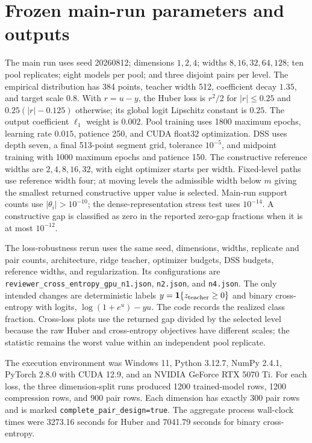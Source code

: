 \documentclass[11pt,a4paper]{article}
\begin{document}
\section*{Frozen main-run parameters and outputs}

The main run uses seed 20260812; dimensions $1,2,4$; widths $8,16,32,64,128$; ten pool replicates; eight models per pool; and three disjoint pairs per level. The empirical distribution has 384 points, teacher width 512, coefficient decay $1.35$, and target scale $0.8$. With $r=u-y$, the Huber loss is $r^2/2$ for $\lvert r\rvert\le0.25$ and $0.25(\lvert r\rvert-0.125)$ otherwise; its global logit Lipschitz constant is $0.25$. The output coefficient $\ell_1$ weight is $0.002$. Pool training uses 1800 maximum epochs, learning rate $0.015$, patience 250, and CUDA float32 optimization. DSS uses depth seven, a final 513-point segment grid, tolerance $10^{-5}$, and midpoint training with 1000 maximum epochs and patience 150. The constructive reference widths are $2,4,8,16,32$, with eight optimizer starts per width. Fixed-level paths use reference width four; at moving levels the admissible width below $m$ giving the smallest returned constructive upper value is selected. Main-run support counts use $\lvert\theta_i\rvert>10^{-10}$; the dense-representation stress test uses $10^{-14}$. A constructive gap is classified as zero in the reported zero-gap fractions when it is at most $10^{-12}$.

The loss-robustness rerun uses the same seed, dimensions, widths, replicate and pair counts, architecture, ridge teacher, optimizer budgets, DSS budgets, reference widths, and regularization. Its configurations are \texttt{reviewer\_cross\_entropy\_gpu\_n1.json}, \texttt{n2.json}, and \texttt{n4.json}. The only intended changes are deterministic labels $y=\mathbf 1\{z_{\rm teacher}\ge0\}$ and binary cross-entropy with logits, $\log(1+e^u)-yu$. The code records the realized class fraction. Cross-loss plots use the returned gap divided by the selected level because the raw Huber and cross-entropy objectives have different scales; the statistic remains the worst value within an independent pool replicate.

The execution environment was Windows 11, Python 3.12.7, NumPy 2.4.1, PyTorch 2.8.0 with CUDA 12.9, and an NVIDIA GeForce RTX 5070 Ti. For each loss, the three dimension-split runs produced 1200 trained-model rows, 1200 compression rows, and 900 pair rows. Each dimension has exactly 300 pair rows and is marked \texttt{complete\_pair\_design=true}. The aggregate process wall-clock times were 3273.16 seconds for Huber and 7041.79 seconds for binary cross-entropy.
\end{document}
